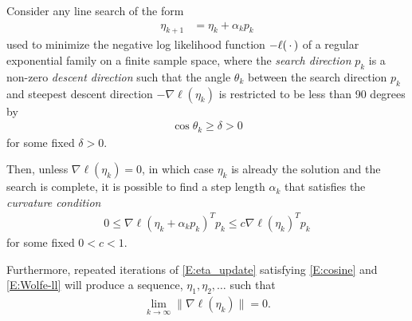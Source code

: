 \begin{theorem} \label{Thm:log like 
max}
Consider any line search of the form 
\begin{align}
	\eta_{k+1} &= \eta_k + \alpha_k p_k \label{E:eta_update}
\end{align}
used to minimize the negative log likelihood function $-\ell(\,\cdot\,)$ of a regular 
exponential family on a finite sample space, where the \emph{search direction} $p_k$ 
is a non-zero \emph{descent direction}
such that the angle $\theta_k$ between the search direction $p_k$ and steepest descent 
direction $-\nabla \ell(\eta_k)$ is 
restricted to be less than 90 degrees by
\begin{align} \label{E:cosine}
\cos \theta_k \geq \delta > 0
\end{align}
 for some fixed $\delta > 0$.  

Then, unless $\nabla \ell(\eta_k) = 0$, in which case $\eta_k$ is already the solution 
and the search is complete, it is 
possible to find a step length $\alpha_k$ that satisfies the \emph{curvature 
condition}
\begin{align}
	0 \leq \nabla \ell( \eta_k + \alpha_k p_k)^T p_k  \leq c \nabla \ell(\eta_k)^T p_k  
\label{E:Wolfe-ll}
\end{align}
for some fixed $0 < c < 1$.

Furthermore, repeated iterations of \eqref{E:eta_update} 
satisfying \eqref{E:cosine} and \eqref{E:Wolfe-ll} will produce a sequence, $\eta_1, \eta_2, \ldots$ such 
that
\begin{align*}
	\lim_{k \to \infty} \lVert \nabla \ell(\eta_k) \rVert = 0.
\end{align*}
\end{theorem}



